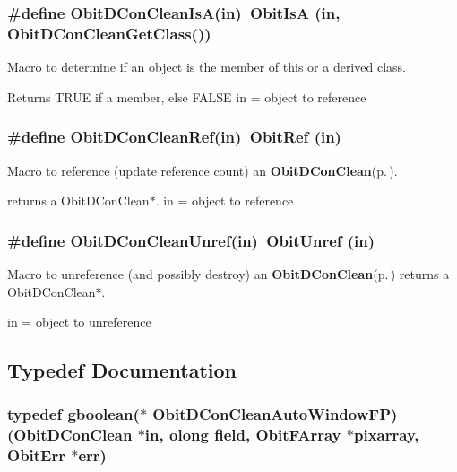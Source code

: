 \subsubsection{\setlength{\rightskip}{0pt plus 5cm}\#define Obit\-DCon\-Clean\-Is\-A(in)\ Obit\-Is\-A (in, Obit\-DCon\-Clean\-Get\-Class())}\label{ObitDConClean_8h_a2}


Macro to determine if an object is the member of this or a derived class. 

Returns TRUE if a member, else FALSE in = object to reference 
\subsubsection{\setlength{\rightskip}{0pt plus 5cm}\#define Obit\-DCon\-Clean\-Ref(in)\ Obit\-Ref (in)}\label{ObitDConClean_8h_a1}


Macro to reference (update reference count) an {\bf Obit\-DCon\-Clean}{\rm (p.\,\pageref{structObitDConClean})}. 

returns a Obit\-DCon\-Clean$\ast$. in = object to reference 
\subsubsection{\setlength{\rightskip}{0pt plus 5cm}\#define Obit\-DCon\-Clean\-Unref(in)\ Obit\-Unref (in)}\label{ObitDConClean_8h_a0}


Macro to unreference (and possibly destroy) an {\bf Obit\-DCon\-Clean}{\rm (p.\,\pageref{structObitDConClean})} returns a Obit\-DCon\-Clean$\ast$. 

in = object to unreference 

\subsection{Typedef Documentation}
\subsubsection{\setlength{\rightskip}{0pt plus 5cm}typedef gboolean($\ast$ {\bf Obit\-DCon\-Clean\-Auto\-Window\-FP})({\bf Obit\-DCon\-Clean} $\ast$in, {\bf olong} field, {\bf Obit\-FArray} $\ast$pixarray, {\bf Obit\-Err} $\ast$err)}\label{ObitDConClean_8h_a11}


